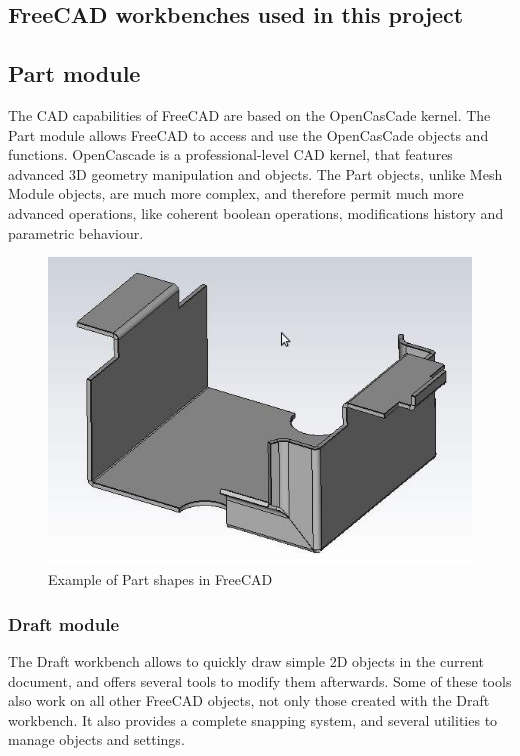 \subsection{FreeCAD workbenches used in this project}
\subsection{Part module}
The CAD capabilities of FreeCAD are based on the OpenCasCade kernel. The 
Part module allows FreeCAD to access and use the OpenCasCade objects and 
functions. OpenCascade is a professional-level CAD kernel, that features 
advanced 3D geometry manipulation and objects. The Part objects, unlike 
Mesh Module objects, are much more complex, and therefore permit much more 
advanced operations, like coherent boolean operations, modifications history 
and parametric behaviour.
\begin{figure}[h!]                                                       
\begin{center}                                                          
\includegraphics[scale=0.5]{images/Part_example.jpg}                     
\caption{Example of Part shapes in FreeCAD}                             \end{center} 
\end{figure}
\subsubsection{Draft module}
The Draft workbench allows to quickly draw simple 2D objects in the current 
document, and offers several tools to modify them afterwards. Some of these 
tools also work on all other FreeCAD objects, not only those created with 
the Draft workbench. It also provides a complete snapping system, and 
several utilities to manage objects and settings.
